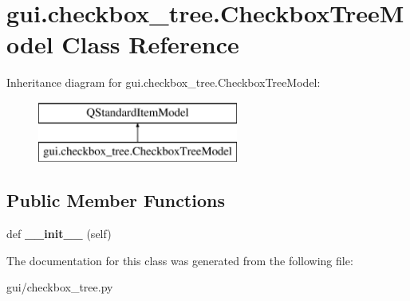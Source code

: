 \hypertarget{classgui_1_1checkbox__tree_1_1_checkbox_tree_model}{}\section{gui.\+checkbox\+\_\+tree.\+Checkbox\+Tree\+Model Class Reference}
\label{classgui_1_1checkbox__tree_1_1_checkbox_tree_model}
Inheritance diagram for gui.\+checkbox\+\_\+tree.\+Checkbox\+Tree\+Model\+:\begin{figure}[H]
\begin{center}
\leavevmode
\includegraphics[height=2.000000cm]{d8/dbd/classgui_1_1checkbox__tree_1_1_checkbox_tree_model}
\end{center}
\end{figure}
\subsection*{Public Member Functions}
\begin{DoxyCompactItemize}
\item 
\mbox{\label{classgui_1_1checkbox__tree_1_1_checkbox_tree_model_ac0c0b45ca4b7d74264b27846c473d33e}} 
def {\bfseries \+\_\+\+\_\+init\+\_\+\+\_\+} (self)
\end{DoxyCompactItemize}


The documentation for this class was generated from the following file\+:\begin{DoxyCompactItemize}
\item 
gui/checkbox\+\_\+tree.\+py\end{DoxyCompactItemize}
